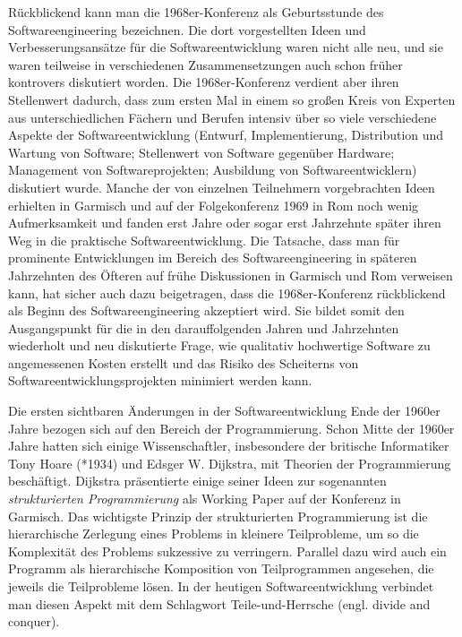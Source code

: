 Rückblickend kann man die 1968er-Konferenz 
als Geburtsstunde des Softwareengineering bezeichnen. Die dort vorgestellten Ideen und Verbesserungsansätze für die Softwareentwicklung waren nicht alle neu, und sie waren teilweise in verschiedenen Zusammensetzungen auch schon früher kontrovers diskutiert worden. Die 1968er-Konferenz verdient aber ihren Stellenwert dadurch, dass zum ersten Mal in einem so großen Kreis von Experten aus unterschiedlichen Fächern und Berufen intensiv über so viele verschiedene Aspekte der Softwareentwicklung (\zb Entwurf, Implementierung, Distribution und Wartung von Software; Stellenwert von Software gegenüber Hardware; Management von Softwareprojekten; Ausbildung von Softwareentwicklern) diskutiert wurde. Manche der von einzelnen Teilnehmern vorgebrachten Ideen erhielten in Garmisch und auf der Folgekonferenz 1969 in Rom noch wenig Aufmerksamkeit und fanden erst Jahre oder sogar erst Jahrzehnte später ihren Weg in die praktische Softwareentwicklung. Die Tatsache, dass man für prominente Entwicklungen im Bereich des Softwareengineering in späteren Jahrzehnten des Öfteren auf frühe Diskussionen in Garmisch und Rom verweisen kann, hat sicher auch dazu beigetragen, dass die 1968er-Konferenz rückblickend als Beginn des Softwareengineering akzeptiert wird. Sie bildet somit den Ausgangspunkt für die in den darauffolgenden Jahren und Jahrzehnten wiederholt und neu diskutierte Frage, wie qualitativ hochwertige Software zu angemessenen Kosten erstellt und das Risiko des Scheiterns von Softwareentwicklungsprojekten minimiert werden kann.


Die ersten sichtbaren Änderungen in der Softwareentwicklung Ende der 1960er Jahre bezogen sich auf den Bereich der Programmierung. Schon Mitte der 1960er Jahre hatten sich einige Wissenschaftler, insbesondere der britische Informatiker Tony Hoare (*1934) und Edsger W. Dijkstra, mit Theorien der Programmierung beschäftigt. Dijk\-stra präsentierte einige seiner Ideen zur sogenannten \textit{strukturierten Programmierung} 
als Working Paper \cite[106 \psq]{nau69} auf der Konferenz in Garmisch. Das wichtigste Prinzip der strukturierten Programmierung ist die hierarchische Zerlegung eines Problems in kleinere Teilprobleme, um so die Komplexität des Problems sukzessive zu verringern. Parallel dazu wird auch ein Programm als hierarchische Komposition von Teilprogrammen angesehen, die jeweils die Teilprobleme lösen. In der heutigen Softwareentwicklung verbindet man diesen Aspekt mit dem Schlagwort Teile-und-Herrsche (engl. divide and conquer). 


